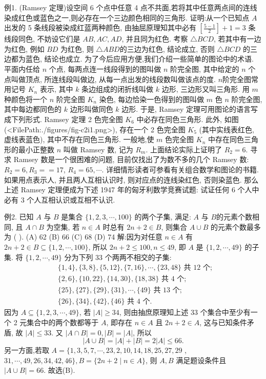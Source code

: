 例1. (Ramsey 定理)设空间 6 个点中任意 4 点不共面,若将其中任意两点间的连线染成红色或蓝色之一,则必存在一个三边颜色相同的三角形.
证明:从一个已知点 $A$ 出发的 5 条线段被染成红蓝两种颜色, 由抽屈原理知其中必有 $\left[\frac{5-1}{2}\right]+1=3$ 条线段同色, 不妨设它们是 $A B, A C, A D$, 并且同为红色.
考察 $\triangle B C D$, 若其中有一边为红色, 例如 $B D$ 为红色, 则 $\triangle A B D$的三边为红色, 结论成立, 否则 $\triangle B C D$ 的三边都为蓝色, 结论也成立.
为了今后应用方便,我们介绍一些简单的图论中的术语.
平面内任给 $n$ 个点, 每两点连一线段得到的图叫做 $n$ 阶完全图, 其中给定的 $n$ 个点叫做顶点, 所连线段叫做边, 从每一点出发的线段数叫做该点的度.
$n$阶完全图常用记号 $K_n$ 表示, 其中 $k$ 条边组成的闭折线叫做 $k$ 边形, 三边形又叫三角形.
用 $m$ 种颜色将一个 $n$ 阶完全图 $K_n$ 染色, 每边恰染一色得到的图叫做 $m$ 色 $n$ 阶完全图, 其中每边都同色的 $k$ 边形叫做同色 $k$ 边形.
于是, Ramsey 定理可用图论的语言写成下列形式.
Ramsey 定理 2 色完全图 $K_6$ 中必存在同色三角形.
此外, 如图(<FilePath:./figures/fig-c2i1.png>), 存在一个 2 色完全图 $K_5$ (其中实线表红色, 虚线表蓝色), 其中不存在同色三角形.
一般地,使 $m$ 色完全图 $K_n$ 中存在同色三角形的最小正整数 $n$ 叫做 Ramsey 数, 记为 $R_m$. 上面结论实际上证明了 $R_2=6$. 寻求 Ramsey 数是一个很困难的问题, 目前仅找出了为数不多的几个 Ramsey 数: $R_2=6, R_3==17$, $R_4=65, \cdots$. 详细情形读者可参看有关组合数学和图论的书籍.
如果用点表示人, 并且两人互相认识时, 则对应点的连线染红色, 否则染蓝色.
那么上述 Ramsey 定理便成为下述 1947 年的匈牙利数学竞赛试题:
试证任何 6 个人中必有 3 个人互相认识或互相不认识.



例2. 已知 $A$ 与 $B$ 是集合 $\{1,2,3, \cdots, 100\}$ 的两个子集, 满足: $A$ 与 $B$的元素个数相同, 且 $A \cap B$ 为空集, 若 $n \in A$ 时总有 $2 n+2 \in B$, 则集合 $A \cup B$
的元素个数最多为 ( ).
(A) 62
(B) 66
(C) 68
(D) 74
解:因为对任意 $n \in A$ 有 $2 n+2 \in B \subseteq\{1,2, \cdots, 100\}$, 所以 $2 n+2 \leqslant 100, n \leqslant 49$, 即 $A$ 是 $\{1,2, \cdots, 49\}$ 的子集.
将 $\{1,2, \cdots, 49\}$ 分为下列 33 个两两不相交的子集:
$$
\begin{aligned}
& \{1,4\},\{3,8\},\{5,12\},\{7,16\}, \cdots,\{23,48\} \text { 共 } 12 \text { 个; } \\
& \{2,6\},\{10,22\},\{14,30\},\{18,38\} \text { 共 } 4 \text { 个; } \\
& \{25\},\{27\},\{29\},\{31\}, \cdots,\{49\} \text { 共 } 13 \text { 个; } \\
& \{26\},\{34\},\{42\},\{46\} \text { 共 } 4 \text { 个.
}
\end{aligned}
$$
因为 $A \subseteq\{1,2,3, \cdots, 49\}$, 若 $|A| \geqslant 34$, 则由抽庶原理知上述 33 个集合中至少有一个 2 元集合中的两个数都等于 $A$, 即存在 $n \in A$ 且 $2 n+2 \in A$, 这与已知条件矛盾, 故 $|A| \leqslant 33$. 又 $|A \cap B|=0,|B|=|A|$, 所以
$$
|A \cup B|=|A|+|B|=2|A| \leqslant 66 .
$$
另一方面,若取 $A=\{1,3,5,7, \cdots, 23,2,10,14,18,25,27,29$ , $31, \cdots, 49,26,34,42,46\}, B=\{2 n+2 \mid n \in A\}$, 则 $A, B$ 满足题设条件且 $|A \cup B|=66$. 故选(B).




